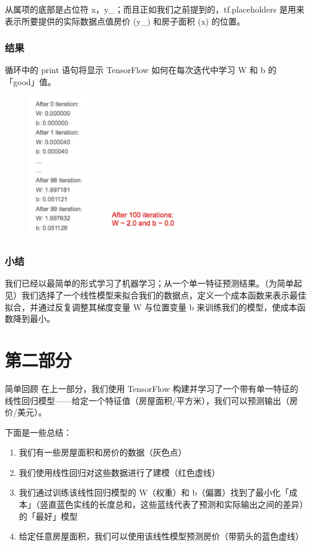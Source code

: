 \documentclass[11pt]{book} %
\begin{document}
从属项的底部是占位符 x，y\_；而且正如我们之前提到的，tf.placeholders 是用来表示所要提供的实际数据点值房价 (y\_) 和房子面积  (x) 的位置。

\subsubsection{结果}
循环中的 print 语句将显示 TensorFlow 如何在每次迭代中学习 W 和 b 的「good」值。

\begin{figure}
\centering
\includegraphics[width=0.7\linewidth]{figures/result}
\caption{}
\label{fig:result}
\end{figure}


\subsubsection{小结}
我们已经以最简单的形式学习了机器学习；从一个单一特征预测结果。（为简单起见）我们选择了一个线性模型来拟合我们的数据点，定义一个成本函数来表示最佳拟合，并通过反复调整其梯度变量 W 与位置变量 b 来训练我们的模型，使成本函数降到最小。

\section{第二部分}

简单回顾
在上一部分，我们使用 TensorFlow 构建并学习了一个带有单一特征的线性回归模型——给定一个特征值（房屋面积/平方米），我们可以预测输出（房价/美元）。

下面是一些总结：
\begin{enumerate}
    \item 我们有一些房屋面积和房价的数据（灰色点）
    \item 我们使用线性回归对这些数据进行了建模（红色虚线）
    \item 我们通过训练该线性回归模型的 W（权重）和 b（偏置）找到了最小化「成本」（竖直蓝色实线的长度总和，这些蓝线代表了预测和实际输出之间的差异）的「最好」模型
    \item 给定任意房屋面积，我们可以使用该线性模型预测房价（带箭头的蓝色虚线）
\end{enumerate}
\end{document}
